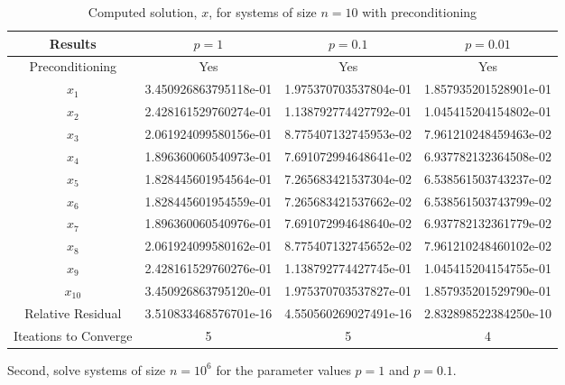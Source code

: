 \documentclass[12pt]{article}
\begin{document}
\begin{itemize}
\begin{table}[H]
\centering
\renewcommand{\arraystretch}{1.3}
\begin{small}
\begin{tabular}{| c || c | c | c |}
\hline
\textbf{Results} &  $p = 1$ & $p = 0.1$ & $p = 0.01$ \\
\hline 
\hline
Preconditioning & Yes & Yes & Yes \\
\hline
$x_1$ & 3.450926863795118e-01  & 1.975370703537804e-01  & 1.857935201528901e-01  \\
$x_2$ & 2.428161529760274e-01  &  1.138792774427792e-01  &  1.045415204154802e-01  \\
$x_3$ &  2.061924099580156e-01  & 8.775407132745953e-02   &  7.961210248459463e-02  \\
$x_4$ &  1.896360060540973e-01  &  7.691072994648641e-02  & 6.937782132364508e-02   \\
$x_5$ &  1.828445601954564e-01  &  7.265683421537304e-02  &  6.538561503743237e-02  \\
$x_6$ &  1.828445601954559e-01  & 7.265683421537662e-02   &  6.538561503743799e-02  \\
$x_7$ &  1.896360060540976e-01  &  7.691072994648640e-02  & 6.937782132361779e-02   \\
$x_8$ &  2.061924099580162e-01  &  8.775407132745652e-02  & 7.961210248460102e-02   \\
$x_9$ &  2.428161529760276e-01   &  1.138792774427745e-01  & 1.045415204154755e-01   \\
$x_{10}$ &  3.450926863795120e-01  &  1.975370703537827e-01  & 1.857935201529790e-01   \\
\hline
Relative Residual &  3.510833468576701e-16  &  4.550560269027491e-16  &  2.832898522384250e-10  \\
\hline
Iteations to Converge & 5  & 5  & 4  \\
\hline
\end{tabular}
\end{small}
\caption{Computed solution, $x$, for systems of size $n=10$ with preconditioning}
\end{table}


Second, solve systems of size $n=10^6$ for the parameter values $p=1$ and $p=0.1$.\\



\end{itemize}
\end{document}
